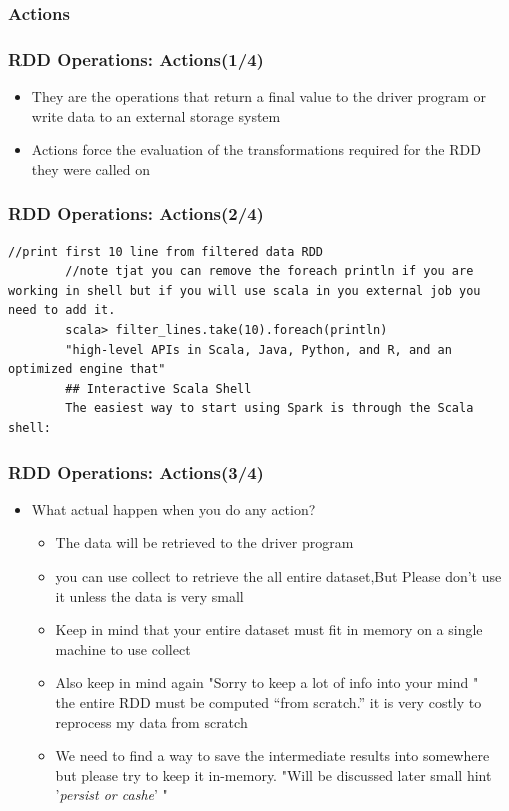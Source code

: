 %
%
%




\subsubsection{Actions}

\begin{frame}[fragile]
  \frametitle{RDD Operations: Actions(1/4)}
	\begin{itemize}[<+->]
		\item They are the operations that return a final value to the driver program or write data to an external storage system
		\item Actions force the evaluation of the transformations required for the RDD they were called on
	\end{itemize}
\end{frame}

\begin{frame}[fragile]
	\frametitle{RDD Operations: Actions(2/4)}

		\begin{lstlisting}[style=myScalastyle, caption=RDD Actions Example 2]
		//print first 10 line from filtered data RDD 
		//note tjat you can remove the foreach println if you are working in shell but if you will use scala in you external job you need to add it.
		scala> filter_lines.take(10).foreach(println)
		"high-level APIs in Scala, Java, Python, and R, and an optimized engine that"
		## Interactive Scala Shell
		The easiest way to start using Spark is through the Scala shell:
		\end{lstlisting}
\end{frame}


\begin{frame}
  \frametitle{RDD Operations: Actions(3/4)}
	\begin{itemize}[<+->]
		\item What actual happen when you do any action?
		\begin{itemize}
			\item The data will be retrieved to the driver program
			\item you can use collect to retrieve the all entire dataset,But Please don't use it unless the data is very small
			\item Keep in mind that your entire dataset must fit in memory on a single machine to use collect\(\)
			\item Also keep in mind again "Sorry to keep a lot of info into your mind " \\ the entire RDD must be computed “from scratch.” it is very costly to reprocess my data from scratch
			\item We need to find a way to save the intermediate results into somewhere but please try to keep it in-memory. "Will be discussed later small hint '\textit{persist or cashe}' "
		\end{itemize}
	\end{itemize}
\end{frame}

